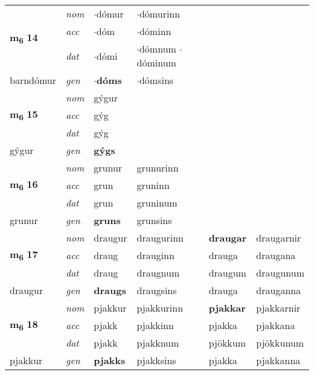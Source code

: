 \begin{longtable}[l]{llllll}
\multirow{3}{*}{{{\textbf{m{\textsubscript{6}}} \Large{\textbf{14}}}}}  & {\footnotesize{{\textit{nom}}}} & $\cdot$dómur & $\cdot$dómurinn    & \textbf{} &   \\*
 &  {\footnotesize{{\textit{acc}}}} & $\cdot$dóm  & $\cdot$dóminn   &   &  \\*
 &  {\footnotesize{{\textit{dat}}}} & $\cdot$dómi & \specialcell{$\cdot$dómnum\\  $\cdot$dóminum}   &  &  \\*
 {\footnotesize{barndómur}} &   {\footnotesize{{\textit{gen}}}} & \textbf{$\cdot$dóms}  & $\cdot$dómsins  &  &  \\
\cmidrule{1-6}


\multirow{3}{*}{{{\textbf{m{\textsubscript{6}}} \Large{\textbf{15}}}}}  & {\footnotesize{{\textit{nom}}}} & gýgur &     & \textbf{} &   \\*
 &  {\footnotesize{{\textit{acc}}}} & gýg  &    &   &  \\*
 &  {\footnotesize{{\textit{dat}}}} & gýg &    &  &  \\*
 {\footnotesize{gýgur}} &   {\footnotesize{{\textit{gen}}}} & \textbf{gýgs}  &   &  &  \\
\cmidrule{1-6}


\multirow{3}{*}{{{\textbf{m{\textsubscript{6}}} \Large{\textbf{16}}}}}  & {\footnotesize{{\textit{nom}}}} & grunur & grunurinn    & \textbf{} &   \\*
 &  {\footnotesize{{\textit{acc}}}} & grun  & gruninn   &   &  \\*
 &  {\footnotesize{{\textit{dat}}}} & grun & gruninum   &  &  \\*
 {\footnotesize{grunur}} &   {\footnotesize{{\textit{gen}}}} & \textbf{gruns}  & grunsins  &  &  \\
\cmidrule{1-6}


\multirow{3}{*}{{{\textbf{m{\textsubscript{6}}} \Large{\textbf{17}}}}}  & {\footnotesize{{\textit{nom}}}} & draugur & draugurinn    & \textbf{draugar} & draugarnir  \\*
 &  {\footnotesize{{\textit{acc}}}} & draug  & drauginn   & drauga  & draugana \\*
 &  {\footnotesize{{\textit{dat}}}} & draug & draugnum   & draugum & draugunum \\*
 {\footnotesize{draugur}} &   {\footnotesize{{\textit{gen}}}} & \textbf{draugs}  & draugsins  & drauga & drauganna \\
\cmidrule{1-6}


\multirow{3}{*}{{{\textbf{m{\textsubscript{6}}} \Large{\textbf{18}}}}}  & {\footnotesize{{\textit{nom}}}} & pjakkur & pjakkurinn    & \textbf{pjakkar} & pjakkarnir  \\*
 &  {\footnotesize{{\textit{acc}}}} & pjakk  & pjakkinn   & pjakka  & pjakkana \\*
 &  {\footnotesize{{\textit{dat}}}} & pjakk & pjakknum   & pjökkum & pjökkunum \\*
 {\footnotesize{pjakkur}} &   {\footnotesize{{\textit{gen}}}} & \textbf{pjakks}  & pjakksins  & pjakka & pjakkanna \\
\cmidrule{1-6}



\end{longtable}
